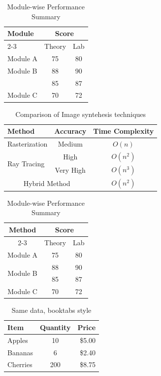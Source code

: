 \begin{table}[h]
  \centering
  \begin{tabular}{|l|c|c|}
    \hline
    \multirow{2}{*}{Module} & \multicolumn{2}{c|}{Score} \\
    \cline{2-3}
     & Theory & Lab \\
    \hline
    Module A & 75 & 80 \\
    Module B & 88 & 90 \\
     & 85 & 87 \\
    Module C & 70 & 72 \\
    \hline
  \end{tabular}
  \caption{Module-wise Performance Summary}
  \label{tab:modules}
\end{table}


\begin{table}[h]
\centering
  \begin{tabular}{|l|c|c|}
    \hline
    Method & Accuracy & Time Complexity \\
    \hline
    Rasterization & Medium & $O(n)$ \\
    \hline
    \multirow{2}{*}{Ray Tracing} & High & $O(n^2)$ \\
    & Very High& $O(n^3)$\\
    \hline
    \multicolumn{2}{|c|}{Hybrid Method} & $O(n^2)$ \\
    \hline
  \end{tabular}
  \caption{ Comparison of Image syntehesis techniques}
\end{table}

\begin{table}
\centering
\begin{tabular}{|c|c|c|}
  \hline
  \multirow{2}{*}{Method} & \multicolumn{2}{c|}{Score} \\
  \cline{2-3}
  & Theory & Lab \\
  \hline
  Module A & 75 & 80\\
  \multirow{2}{*}{Module B} & 88 & 90\\
  & 85 & 87\\
  \hline
  Module C & 70 & 72\\
  \hline
  
\end{tabular}
\caption{Module-wise Performance Summary}
\end{table}


\begin{table}[h]
  \centering
  \begin{tabular}{lcr}
    \toprule
    Item & Quantity & Price \\
    \midrule
    Apples & 10 & \$5.00 \\
    Bananas & 6 & \$2.40 \\
    Cherries & 200 & \$8.75 \\
    \bottomrule
  \end{tabular}
  \caption{Same data, booktabs style}
\end{table}








